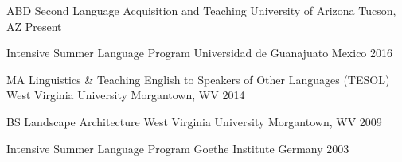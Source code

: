 



\begin{cvhonors}

\cvhonor
{ABD Second Language Acquisition and Teaching} %
{University of Arizona} %
{Tucson, AZ} %
{Present} %

\cvhonor
{Intensive Summer Language Program} %
{Universidad de Guanajuato} %
{Mexico} %
{2016} %

\cvhonor
{MA Linguistics \& Teaching English to Speakers of Other Languages (TESOL)} %
{West Virginia University} %
{Morgantown, WV} %
{2014} %

\cvhonor
{BS Landscape Architecture} %
{West Virginia University} %
{Morgantown, WV} %
{2009} %

\cvhonor
{Intensive Summer Language Program} %
{Goethe Institute} %
{Germany} %
{2003} %


\end{cvhonors}



